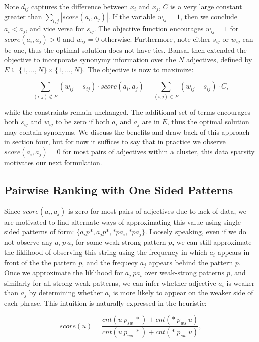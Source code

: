 \documentclass[11pt,letterpaper]{article}
\begin{document}
Note $d_{ij}$ captures the difference between $x_i$ and $x_j$, $C$ is a very large constant greater than $\sum_{i,j} |score(a_i,a_j)|$. If the variable $w_{ij} = 1$, then we conclude $a_i < a_j$, and vice versa for $s_{ij}$. The objective function encourages $w_{ij} = 1$  for $score(a_i,a_j) > 0$ and $w_{ij} = 0$ otherwise. Furthermore, note either $s_{ij}$ or $w_{ij}$ can be one, thus the optimal solution does not have ties. Bansal then extended the objective to incorporate synonymy information over the $N$ adjectives, defined by $E \subseteq \{1,...,N\} \times \{1,...,N\}$. The objective is now to maximize:

\[ \sum_{(i,j) \not\in E} (w_{ij} - s_{ij}) \cdot score(a_i, a_j) - \sum_{(i,j) \in E} (w_{ij} + s_{ij}) \cdot C,\]

while the constraints remain unchanged. The additional set of terms encourages both $s_{ij}$ and $w_{ij}$ to be zero if both $a_i$ and $a_j$ are in $E$, thus the optimal solution may contain synonyms. We discuss the benefits and draw back of this approach in section four, but for now it suffices to say that in practice we observe $score(a_i, a_j) = 0$ for most pairs of adjectives within a cluster, this data sparsity motivates our next formulation.

\subsection{Pairwise Ranking with One Sided Patterns}

Since $score(a_i, a_j)$ is zero for most pairs of adjectives due to lack of data, we are motivated to find alternate ways of approximating this value using single sided patterns of form: $\{a_i p *, a_j p *, * p a_i, * p a_j\}$. Loosely speaking, even if we do not observe any $a_i \: p \: a_j$ for some weak-strong pattern $p$, we can still approximate the liklihood of observing this string using the frequency in which $a_i$ appears in front of the the pattern $p$, and the frequecy $a_j$ appears behind the pattern $p$. Once we approximate the liklihood for $a_j \: p a_i$ over weak-strong patterns $p$, and similarly for all strong-weak patterns, we can infer whether adjective $a_i$ is weaker than $a_j$ by determining whether $a_i$ is more likely to appear on the weaker side of each phrase. This intuition is naturally expressed in the heuristic:

\[
  score(u) = \frac{ cnt(u \: p_{sw} \: *) + cnt(* \: p_{ws} \: u)  }
                  { cnt(u \: p_{ws} \: *) + cnt(* \: p_{sw} \: u) },
\]
\end{document}
